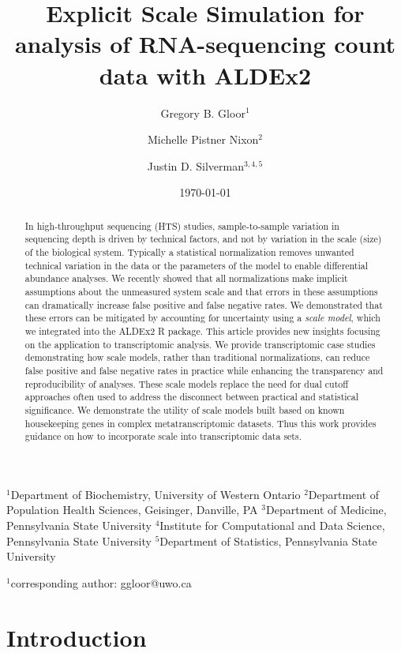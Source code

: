 \documentclass[
]{article}
\title{Explicit Scale Simulation for analysis of RNA-sequencing count
data with ALDEx2}
\author{Gregory B. Gloor$^1$ \and Michelle Pistner Nixon$^2$ \and Justin D. Silverman$^{3,4,5}$}
\date{\today}
\begin{document}
\maketitle

$^1$Department of Biochemistry, University of Western Ontario
$^2$Department of Population Health Sciences, Geisinger, Danville, PA
$^3$Department of Medicine, Pennsylvania State University
$^4$Institute for Computational and Data Science, Pennsylvania State University
$^5$Department of Statistics, Pennsylvania State University

$^1$corresponding author: ggloor@uwo.ca
\begin{abstract}
In high-throughput sequencing (HTS) studies, sample-to-sample variation
in sequencing depth is driven by technical factors, and not by variation
in the scale (size) of the biological system. Typically a statistical
normalization removes unwanted technical variation in the data or the
parameters of the model to enable differential abundance analyses. We
recently showed that all normalizations make implicit assumptions about
the unmeasured system scale and that errors in these assumptions can
dramatically increase false positive and false negative rates. We
demonstrated that these errors can be mitigated by accounting for
uncertainty using a \emph{scale model}, which we integrated into the
ALDEx2 R package. This article provides new insights focusing on the
application to transcriptomic analysis. We provide transcriptomic case
studies demonstrating how scale models, rather than traditional
normalizations, can reduce false positive and false negative rates in
practice while enhancing the transparency and reproducibility of
analyses. These scale models replace the need for dual cutoff approaches
often used to address the disconnect between practical and statistical
significance. We demonstrate the utility of scale models built based on
known housekeeping genes in complex metatranscriptomic datasets. Thus
this work provides guidance on how to incorporate scale into
transcriptomic data sets.
\end{abstract}

\section{Introduction}\label{introduction}

\doublespacing \singlespacing 
\linenumbers
\end{document}
